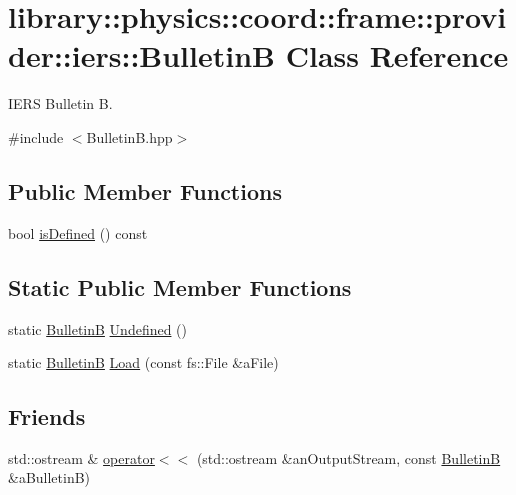 \hypertarget{classlibrary_1_1physics_1_1coord_1_1frame_1_1provider_1_1iers_1_1_bulletin_b}{}\section{library\+:\+:physics\+:\+:coord\+:\+:frame\+:\+:provider\+:\+:iers\+:\+:BulletinB Class Reference}
\label{classlibrary_1_1physics_1_1coord_1_1frame_1_1provider_1_1iers_1_1_bulletin_b}


I\+E\+RS Bulletin B.  




{\ttfamily \#include $<$Bulletin\+B.\+hpp$>$}

\subsection*{Public Member Functions}
\begin{DoxyCompactItemize}
\item 
bool \hyperlink{classlibrary_1_1physics_1_1coord_1_1frame_1_1provider_1_1iers_1_1_bulletin_b_ae385502ba4612cdd801c42ddd7f79bb8}{is\+Defined} () const
\end{DoxyCompactItemize}
\subsection*{Static Public Member Functions}
\begin{DoxyCompactItemize}
\item 
static \hyperlink{classlibrary_1_1physics_1_1coord_1_1frame_1_1provider_1_1iers_1_1_bulletin_b}{BulletinB} \hyperlink{classlibrary_1_1physics_1_1coord_1_1frame_1_1provider_1_1iers_1_1_bulletin_b_a6f8a61852b6d83898e3dd800af65e88a}{Undefined} ()
\item 
static \hyperlink{classlibrary_1_1physics_1_1coord_1_1frame_1_1provider_1_1iers_1_1_bulletin_b}{BulletinB} \hyperlink{classlibrary_1_1physics_1_1coord_1_1frame_1_1provider_1_1iers_1_1_bulletin_b_af50be94b68f3eb752f2e5fd8a4f016cd}{Load} (const fs\+::\+File \&a\+File)
\end{DoxyCompactItemize}
\subsection*{Friends}
\begin{DoxyCompactItemize}
\item 
std\+::ostream \& \hyperlink{classlibrary_1_1physics_1_1coord_1_1frame_1_1provider_1_1iers_1_1_bulletin_b_a36d9e78a5de0361186ca1cb63ab6f1ee}{operator$<$$<$} (std\+::ostream \&an\+Output\+Stream, const \hyperlink{classlibrary_1_1physics_1_1coord_1_1frame_1_1provider_1_1iers_1_1_bulletin_b}{BulletinB} \&a\+BulletinB)
\end{DoxyCompactItemize}


